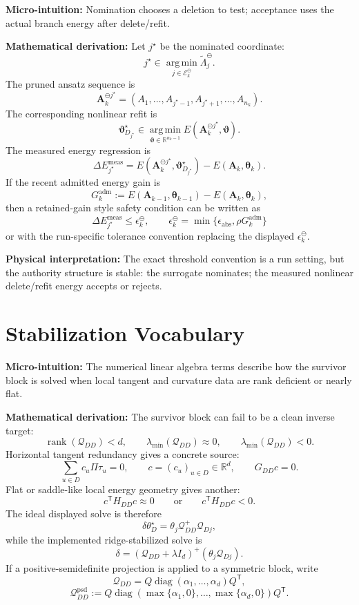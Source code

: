 \documentclass[10pt,twocolumn]{article}
\newcommand{\blocktitle}[1]{\vspace{2pt}\noindent\textbf{#1}\space}
\newcommand{\micro}[1]{\blocktitle{Micro-intuition:} #1}
\newcommand{\deriv}{\blocktitle{Mathematical derivation:}}
\newcommand{\phys}[1]{\blocktitle{Physical interpretation:} #1}
\begin{document}
\micro{Nomination chooses a deletion to test; acceptance uses the actual branch energy after delete/refit.}

\deriv
Let \(j^\star\) be the nominated coordinate:
\[
j^\star
\in
\operatorname*{arg\,min}_{j\in\mathcal E_k^\ominus}
\widetilde{\Lambda}_j^\ominus .
\]
The pruned ansatz sequence is
\[
\mathbf A_k^{\ominus j^\star}
=
(A_1,\ldots,A_{j^\star-1},A_{j^\star+1},\ldots,A_{n_k}).
\]
The corresponding nonlinear refit is
\[
\boldsymbol\vartheta_{D_{j^\star}}^\star
\in
\operatorname*{arg\,min}_{\boldsymbol\vartheta\in\mathbb R^{n_k-1}}
E(\mathbf A_k^{\ominus j^\star},\boldsymbol\vartheta).
\]
The measured energy regression is
\[
\Delta E_{j^\star}^{\mathrm{meas}}
=
E(\mathbf A_k^{\ominus j^\star},\boldsymbol\vartheta_{D_{j^\star}}^\star)
-
E(\mathbf A_k,\boldsymbol\theta_k).
\]
If the recent admitted energy gain is
\[
G_k^{\mathrm{adm}}
:=
E(\mathbf A_{k-1},\boldsymbol\theta_{k-1})
-
E(\mathbf A_k,\boldsymbol\theta_k),
\]
then a retained-gain style safety condition can be written as
\[
\Delta E_{j^\star}^{\mathrm{meas}}
\le
\epsilon_k^\ominus,
\qquad
\epsilon_k^\ominus
=
\min\{\epsilon_{\mathrm{abs}},\rho G_k^{\mathrm{adm}}\}
\]
or with the run-specific tolerance convention replacing the displayed \(\epsilon_k^\ominus\).

\phys{The exact threshold convention is a run setting, but the authority structure is stable: the surrogate nominates; the measured nonlinear delete/refit energy accepts or rejects.}

\section*{Stabilization Vocabulary}

\micro{The numerical linear algebra terms describe how the survivor block is solved when local tangent and curvature data are rank deficient or nearly flat.}

\deriv
The survivor block can fail to be a clean inverse target:
\[
\operatorname{rank}(\mathcal Q_{DD})<d,
\qquad
\lambda_{\min}(\mathcal Q_{DD})\approx0,
\qquad
\lambda_{\min}(\mathcal Q_{DD})<0 .
\]
Horizontal tangent redundancy gives a concrete source:
\[
\sum_{u\in D}c_u\Pi\tau_u=0,
\qquad
c=(c_u)_{u\in D}\in\mathbb R^d,
\qquad
G_{DD}c=0 .
\]
Flat or saddle-like local energy geometry gives another:
\[
c^{\mathsf T}H_{DD}c\approx0
\qquad
\text{or}
\qquad
c^{\mathsf T}H_{DD}c<0 .
\]
The ideal displayed solve is therefore
\[
\delta\theta_D^\star
=
\theta_j\mathcal Q_{DD}^{+}\mathcal Q_{Dj},
\]
while the implemented ridge-stabilized solve is
\[
\delta
=
(\mathcal Q_{DD}+\lambda I_d)^+(\theta_j\mathcal Q_{Dj}).
\]
If a positive-semidefinite projection is applied to a symmetric block, write
\[
\mathcal Q_{DD}
=
Q\operatorname{diag}(\alpha_1,\ldots,\alpha_d)Q^{\mathsf T},
\]
\[
\mathcal Q_{DD}^{\mathrm{psd}}
:=
Q\operatorname{diag}(\max\{\alpha_1,0\},\ldots,\max\{\alpha_d,0\})Q^{\mathsf T}.
\]
\end{document}
